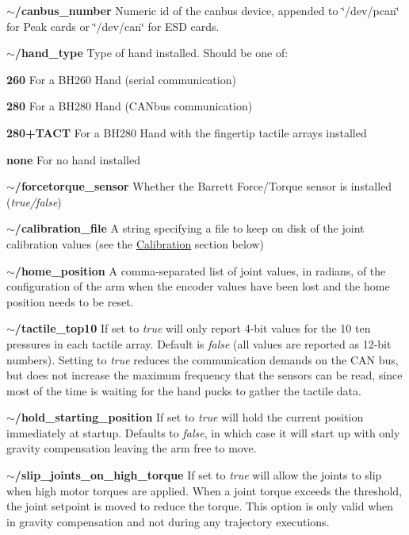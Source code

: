 \begin{DoxyItemize}
\item {\bfseries $\sim$/canbus\-\_\-number} Numeric id of the canbus device, appended to \char`\"{}/dev/pcan\char`\"{} for Peak cards or \char`\"{}/dev/can\char`\"{} for E\-S\-D cards.
\item {\bfseries $\sim$/hand\-\_\-type} Type of hand installed. Should be one of\-:
\begin{DoxyItemize}
\item {\bfseries 260} For a B\-H260 Hand (serial communication)
\item {\bfseries 280} For a B\-H280 Hand (C\-A\-Nbus communication)
\item {\bfseries 280+\-T\-A\-C\-T} For a B\-H280 Hand with the fingertip tactile arrays installed
\item {\bfseries none} For no hand installed
\end{DoxyItemize}
\item {\bfseries $\sim$/forcetorque\-\_\-sensor} Whether the Barrett Force/\-Torque sensor is installed ({\itshape true/false})
\item {\bfseries $\sim$/calibration\-\_\-file} A string specifying a file to keep on disk of the joint calibration values (see the \hyperlink{index_calibration}{Calibration} section below)
\item {\bfseries $\sim$/home\-\_\-position} A comma-\/separated list of joint values, in radians, of the configuration of the arm when the encoder values have been lost and the home position needs to be reset.
\item {\bfseries $\sim$/tactile\-\_\-top10} If set to {\itshape true} will only report 4-\/bit values for the 10 ten pressures in each tactile array. Default is {\itshape false} (all values are reported as 12-\/bit numbers). Setting to {\itshape true} reduces the communication demands on the C\-A\-N bus, but does not increase the maximum frequency that the sensors can be read, since most of the time is waiting for the hand pucks to gather the tactile data.
\item {\bfseries $\sim$/hold\-\_\-starting\-\_\-position} If set to {\itshape true} will hold the current position immediately at startup. Defaults to {\itshape false}, in which case it will start up with only gravity compensation leaving the arm free to move.
\item {\bfseries $\sim$/slip\-\_\-joints\-\_\-on\-\_\-high\-\_\-torque} If set to {\itshape true} will allow the joints to slip when high motor torques are applied. When a joint torque exceeds the threshold, the joint setpoint is moved to reduce the torque. This option is only valid when in gravity compensation and not during any trajectory executions.

\end{DoxyItemize}
